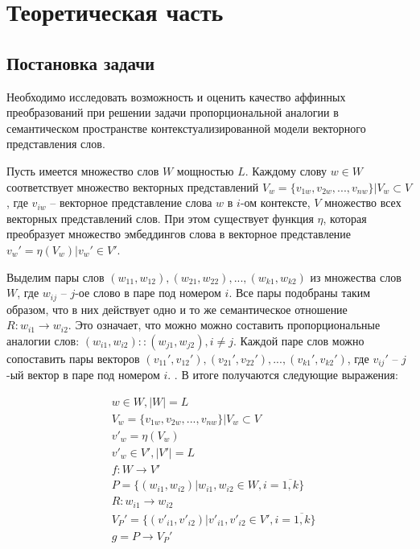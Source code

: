 \documentclass[a4paper,14pt]{article}
\begin{document}
\newpage

\section{Теоретическая часть}

\subsection{Постановка задачи}

Необходимо исследовать возможность и оценить качество аффинных преобразований при решении задачи пропорциональной аналогии в семантическом пространстве контекстуализированной модели векторного представления слов.

Пусть имеется множество слов $W$ мощностью $L$. Каждому слову $w \in W$ соответствует множество векторных представлений $V_w = \{v_{1w}, v_{2w}, ..., v_{nw}\}| V_w \subset V$, где $v_{iw}$ -- векторное представление слова $w$ в $i$-ом контексте, $V$ множество всех векторных представлений слов.
При этом существует функция $\eta$, которая преобразует множество эмбеддингов слова в векторное представление $v_w' = \eta(V_w) | v_w' \in V'$.

Выделим пары слов $(w_{11},w_{12}), (w_{21},w_{22}), ..., (w_{k1},w_{k2})$ из множества слов $W$, где $w_{ij}$ -- $j$-ое слово в паре под номером $i$.
Все пары подобраны таким образом, что в них действует одно и то же семантическое отношение $R:w_{i1} \rightarrow w_{i2}$.
Это означает, что можно можно составить пропорциональные аналогии слов: $(w_{i1}, w_{i2})::(w_{j1}, w_{j2}), i \neq j$.
Каждой паре слов можно сопоставить пары векторов $(v_{11}',v_{12}'), (v_{21}',v_{22}'), ..., (v_{k1}',v_{k2}')$, где $v_{ij}'$ -- $j$-ый вектор в паре под номером $i$. .
В итоге получаются следующие выражения:

\begin{align*}
&w \in W, |W| = L\\
&V_w = \{v_{1w}, v_{2w}, ..., v_{nw}\}| V_w \subset V\\
&v'_w = \eta(V_w)\\
&v'_w \in V', |V'| = L\\
&f : W \rightarrow V'\\
&P = \{(w_{i1}, w_{i2})|w_{i1}, w_{i2} \in W, i=\overline{1,k}\}\\
&R:w_{i1} \rightarrow w_{i2}\\
&V_P' = \{(v'_{i1}, v'_{i2})|v'_{i1}, v'_{i2} \in V', i=\overline{1,k}\}\\
&g = P \rightarrow V_P'
\end{align*}
\end{document}
